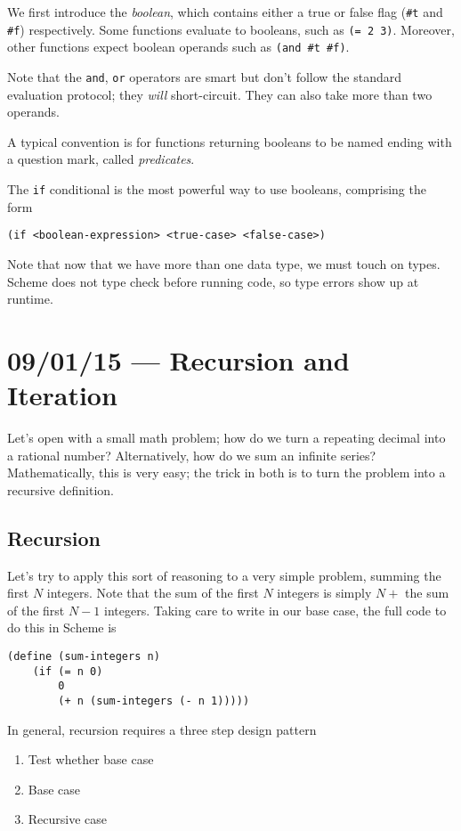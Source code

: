 \documentclass[10pt]{report}
\begin{document}
We first introduce the \emph{boolean}, which contains either a true or false flag (\texttt{\#t} and \texttt{\#f}) respectively. Some functions evaluate to booleans, such as \texttt{(= 2 3)}. Moreover, other functions expect boolean operands such as \texttt{(and \#t \#f)}. 

\begin{center}
    Note that the \texttt{and}, \texttt{or} operators are smart but don't follow the standard evaluation protocol; they \emph{will} short-circuit. They can also take more than two operands.
\end{center}

A typical convention is for functions returning booleans to be named ending with a question mark, called \emph{predicates}. 

The \texttt{if} conditional is the most powerful way to use booleans, comprising the form
\begin{center}
    \texttt{(if <boolean-expression> <true-case> <false-case>)}
\end{center}

Note that now that we have more than one data type, we must touch on types. Scheme does not type check before running code, so type errors show up at runtime.
\chapter{09/01/15 --- Recursion and Iteration}

Let's open with a small math problem; how do we turn a repeating decimal into a rational number? Alternatively, how do we sum an infinite series? Mathematically, this is very easy; the trick in both is to turn the problem into a recursive definition.

\section{Recursion}

Let's try to apply this sort of reasoning to a very simple problem, summing the first $N$ integers. Note that the sum of the first $N$ integers is simply $N + $ the sum of the first $N-1$ integers. Taking care to write in our base case, the full code to do this in Scheme is
\begin{verbatim}
(define (sum-integers n)
    (if (= n 0)
        0
        (+ n (sum-integers (- n 1)))))
\end{verbatim}

In general, recursion requires a three step design pattern
\begin{enumerate}[1.]
    \item Test whether base case
    \item Base case
    \item Recursive case
\end{enumerate}
\end{document}
